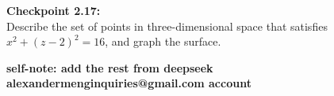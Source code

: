 \documentclass{article}
\begin{document}
\begin{exercisebox}
    \textbf{Checkpoint 2.17:} \\
    Describe the set of points in three-dimensional space that satisfies \(x^2 + (z - 2)^2 = 16\), and graph the surface.
\end{exercisebox}

\textbf{self-note: add the rest from deepseek alexandermenginquiries@gmail.com account}

\cleardoublepage
{}


\normalsize

\setcounter{page}{1}
\end{document}
